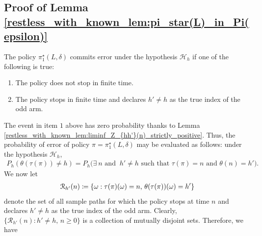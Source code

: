 \subsection{Proof of Lemma \ref{restless_with_known_lem:pi_star(L)_in_Pi(epsilon)}}\label{restless_with_known_appndx:proof_of_lem_pi_star(L)_in_Pi(epsilon)}
 The policy $\pi_1^\star(L,\delta)$ commits error under the hypothesis $\mathcal{H}_h$ if one of the following is true:
\begin{enumerate}
	\item The policy does not stop in finite time.
	\item The policy stops in finite time and declares $h'\neq h$ as the true index of the odd arm.
\end{enumerate}
The event in item $1$ above has zero probability thanks to Lemma \ref{restless_with_known_lem:liminf_Z_{hh'}(n)_strictly_positive}.
Thus, the probability of error of policy $\pi=\pi_1^\star(L,\delta)$ may be evaluated as follows: under the hypothesis $\mathcal{H}_h$,
\begin{align}
	P_h(\theta(\tau(\pi))\neq h)
	=P_h\bigg(\exists~ n\text{ and }~h'\neq h\text{ such that } \tau(\pi)=n\text{ and }
	\theta(n)=h'\bigg).\label{restless_with_known_eq:P_e_partial_1}
\end{align}
We now let
\begin{align}
	\mathcal{R}_{h'}(n)\coloneqq\{\omega:\tau(\pi)(\omega)=n,\,\theta(\tau(\pi))(\omega)=h'\}\label{restless_with_known_eq:R_{h'}(n)}
\end{align}
denote the set of all sample paths for which the policy stops at time $n$ and declares $h'\neq h$ as the true index of the odd arm. Clearly, $\{\mathcal{R}_{h'}(n):h'\neq h,\,n\geq 0\}$ is a collection of mutually disjoint sets. Therefore, we have
